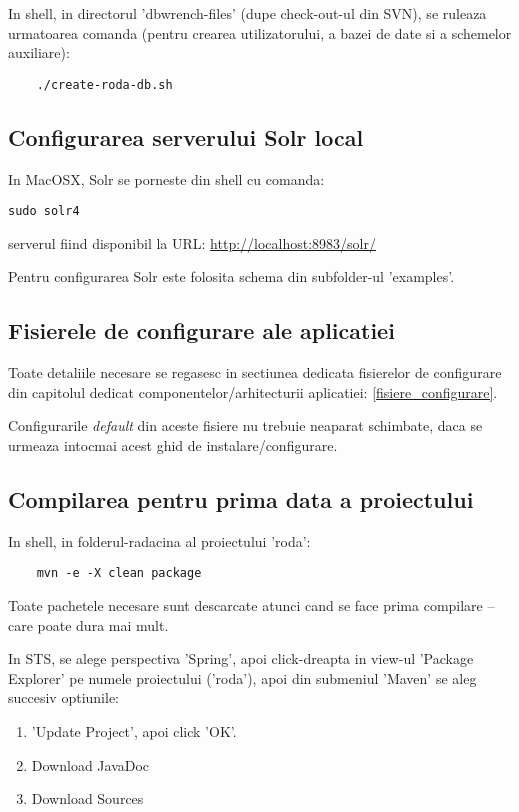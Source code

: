 In shell, in directorul 'dbwrench-files' (dupe check-out-ul din SVN), 
se ruleaza urmatoarea comanda
(pentru crearea utilizatorului, a bazei de date si a schemelor auxiliare):
\begin{lstlisting}
	./create-roda-db.sh
\end{lstlisting}

\subsection{Configurarea serverului Solr local}
\label{solr_configurare}

In MacOSX, Solr se porneste din shell cu comanda:
\begin{lstlisting}[breaklines=true]
	sudo solr4
\end{lstlisting}
serverul fiind disponibil la URL: \url{http://localhost:8983/solr/}

Pentru configurarea Solr este folosita schema din subfolder-ul 'examples'. 

\subsection{Fisierele de configurare ale aplicatiei}
Toate detaliile necesare se regasesc in sectiunea
dedicata fisierelor de configurare din capitolul dedicat componentelor/arhitecturii aplicatiei: 
\ref{fisiere_configurare}.

Configurarile \emph{default} din aceste fisiere nu trebuie neaparat
schimbate, daca se urmeaza intocmai acest ghid de instalare/configurare.

\subsection{Compilarea pentru prima data a proiectului}

In shell, in folderul-radacina al proiectului 'roda':
\begin{lstlisting}
	mvn -e -X clean package
\end{lstlisting}
Toate pachetele necesare sunt descarcate atunci cand se face prima compilare -- care poate dura mai mult.

In STS, se alege perspectiva 'Spring', 
apoi click-dreapta in view-ul 'Package Explorer' 
pe numele proiectului ('roda'), 
apoi din submeniul 'Maven' se aleg succesiv optiunile:
\begin{enumerate}
\item
'Update Project', apoi click 'OK'.
\item
Download JavaDoc
\item
Download Sources
\end{enumerate}

